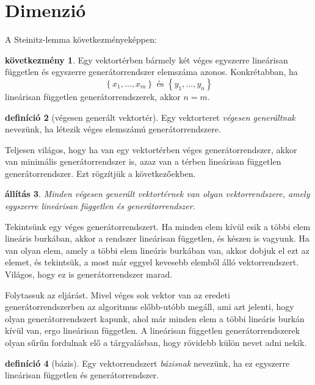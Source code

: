 \documentclass[9pt, a4paper, showtrims]{memoir}
\makeatletter
\renewenvironment{proof}[1][\proofname]
    {\par\pushQED{\qed}%
    \normalfont \topsep6\p@\@plus6\p@\relax
    \trivlist
    \item[\hskip\labelsep
        \itshape
    #1\@addpunct{:}]\ignorespaces}
    {\popQED\endtrivlist\@endpefalse}
\theoremstyle{plain}
\newtheorem{proposition}{állítás}[chapter]
\theoremstyle{remark}
\theoremstyle{definition}
\newtheorem{definition}[proposition]{definíció}
\newtheorem{corollary}[proposition]{következmény}
\makeatother
\begin{document}
\section{Dimenzió}
A Steinitz-lemma következményeképpen: 
\begin{corollary}
    Egy vektortérben bármely két véges egyszerre lineárisan független és egyszerre generátorrendszer elemszáma azonos.
    Konkrétabban, ha
    \[
        \left\{ x_1,\dots,x_m \right\} \text{ és } \left\{ y_1,\dots,y_n \right\}
    \]
    lineárisan független generátorrendszerek, akkor $n=m$.
    \label{co:baziselemszam}
\end{corollary}
\begin{definition}[végesen generált vektortér]
    Egy vektorteret \emph{végesen generáltnak} nevezünk,
    ha létezik véges elemszámú generátorrendszere.
\end{definition}
Teljesen világos, hogy ha van egy vektortérben véges generátorrendszer,
akkor van minimális generátorrendszer is, azaz van a térben lineárisan független generátorrendszer.
Ezt rögzítjük a következőekben.
\begin{proposition}
    Minden végesen generált vektortérnek van olyan vektorrendszere, 
    amely egyszerre lineárisan független és generátorrendszer.
    \label{pr:bazisletezik}
\end{proposition}
\begin{proof}
    Tekintsünk egy véges generátorrendszert.
    Ha minden elem kívül esik a többi elem lineáris burkában, akkor a rendszer lineárisan független, és készen is vagyunk.
    Ha van olyan elem, amely a többi elem lineáris burkában van, akkor dobjuk el ezt az elemet, és tekintsük, a most már
    eggyel kevesebb elemből álló vektorrendszert. 
    Világos, hogy ez is generátorrendszer marad.

    Folytassuk az eljárást.
    Mivel véges sok vektor van az eredeti generátorrendszerben az algoritmus előbb-utóbb megáll,
    ami azt jelenti, hogy olyan generátorrendszert kapunk, 
    ahol már minden elem a többi lineáris burkán kívül van,
    ergo lineárisan független.
\end{proof}
A lineárisan független generátorrendszerek olyan sűrűn fordulnak elő a tárgyalásban,
hogy rövidebb külön nevet adni nekik.
\begin{definition}[bázis]
    Egy vektorrendszert \emph{bázisnak} nevezünk, ha ez egyszerre lineárisan független és generátorrendszer.
\end{definition}
\end{document}
